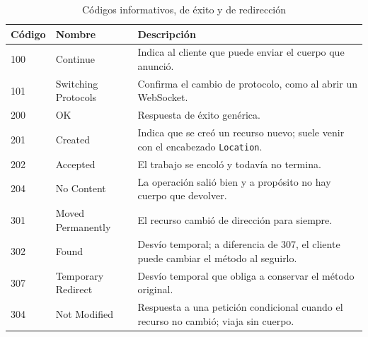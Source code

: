 \documentclass[10pt,a4paper]{article}
\begin{document}
\begin{table}[H]
	\centering
	\begin{tabular}{p{1.8cm} | p{4cm} | p{9.3cm}}\hline \hline
		\textbf{Código} & \textbf{Nombre} & \textbf{Descripción} \\ \hline \hline
		100 & Continue & Indica al cliente que puede enviar el cuerpo que anunció. \\ \hline
		101 & Switching Protocols & Confirma el cambio de protocolo, como al abrir un WebSocket. \\ \hline
		200 & OK & Respuesta de éxito genérica. \\ \hline
		201 & Created & Indica que se creó un recurso nuevo; suele venir con el encabezado \texttt{Location}. \\ \hline
		202 & Accepted & El trabajo se encoló y todavía no termina. \\ \hline
		204 & No Content & La operación salió bien y a propósito no hay cuerpo que devolver. \\ \hline
		301 & Moved Permanently & El recurso cambió de dirección para siempre. \\ \hline
		302 & Found & Desvío temporal; a diferencia de 307, el cliente puede cambiar el método al seguirlo. \\ \hline
		307 & Temporary Redirect & Desvío temporal que obliga a conservar el método original. \\ \hline
		304 & Not Modified & Respuesta a una petición condicional cuando el recurso no cambió; viaja sin cuerpo. \\ \hline \hline
	\end{tabular}
	\caption{Códigos informativos, de éxito y de redirección}
	\label{tabla:codigos-1xx-3xx}
\end{table}
\end{document}
